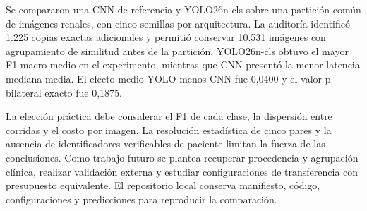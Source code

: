 Se compararon una CNN de referencia y YOLO26n-cls sobre una partición común de imágenes renales, con cinco semillas por arquitectura. La auditoría identificó 1.225 copias exactas adicionales y permitió conservar 10.531 imágenes con agrupamiento de similitud antes de la partición. YOLO26n-cls obtuvo el mayor F1 macro medio en el experimento, mientras que CNN presentó la menor latencia mediana media. El efecto medio YOLO menos CNN fue 0{,}0400 y el valor p bilateral exacto fue 0{,}1875.

La elección práctica debe considerar el F1 de cada clase, la dispersión entre corridas y el costo por imagen. La resolución estadística de cinco pares y la ausencia de identificadores verificables de paciente limitan la fuerza de las conclusiones. Como trabajo futuro se plantea recuperar procedencia y agrupación clínica, realizar validación externa y estudiar configuraciones de transferencia con presupuesto equivalente. El repositorio local conserva manifiesto, código, configuraciones y predicciones para reproducir la comparación.